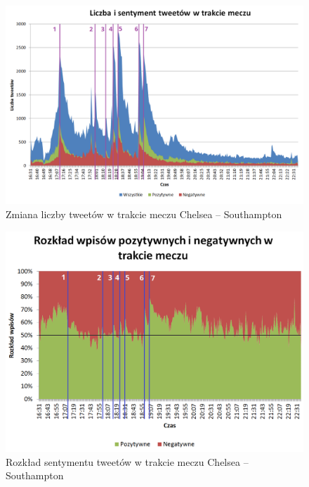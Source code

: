 \begin{figure}[ht!]
\centering
\includegraphics[width=160mm]{img/tweety-w-meczu-nums.png}
\caption{Zmiana liczby tweetów w trakcie meczu Chelsea -- Southampton}
\label{image:tweety-w-meczu}
\end{figure}


\begin{figure}[ht!]
\centering
\includegraphics[width=140mm]{img/sentyment-w-meczu-nums-50percentage.png}
\caption{Rozkład sentymentu tweetów w trakcie meczu Chelsea -- Southampton}
\label{image:sentyment-w-meczu}
\end{figure}


